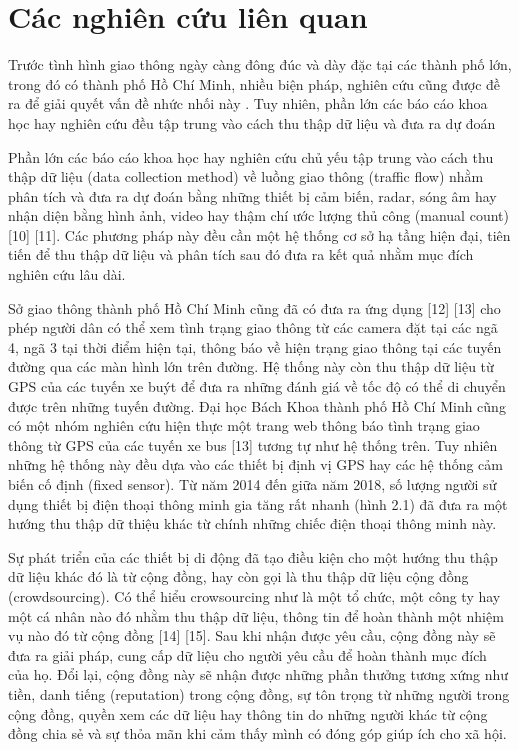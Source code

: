 
\chapter{Các nghiên cứu liên quan} %

\label{Chapter2} %

Trước tình hình giao thông ngày càng đông đúc và dày đặc tại các thành phố lớn, trong đó có thành phố Hồ Chí Minh, nhiều biện pháp, nghiên cứu cũng được đề ra để giải quyết vấn đề nhức nhối này \cite{FSPPM}. Tuy nhiên, phần lớn các báo cáo khoa học hay nghiên cứu đều tập trung vào cách thu thập dữ liệu và đưa ra dự đoán 

Phần lớn các báo cáo khoa học hay nghiên cứu chủ yếu tập trung vào cách thu thập dữ liệu (data collection method) về luồng giao thông (traffic flow) nhằm phân tích và đưa ra dự đoán bằng những thiết bị cảm biến, radar, sóng âm hay nhận diện bằng hình ảnh, video hay thậm chí ước lượng thủ công (manual count) [10] [11]. Các phương pháp này đều cần một hệ thống cơ sở hạ tầng hiện đại, tiên tiến để thu thập dữ liệu và phân tích sau đó đưa ra kết quả nhằm mục đích nghiên cứu lâu dài.

Sở giao thông thành phố Hồ Chí Minh cũng đã có đưa ra ứng dụng [12] [13] cho phép người dân có thể xem tình trạng giao thông từ các camera đặt tại các ngã 4, ngã 3 tại thời điểm hiện tại, thông báo về hiện trạng giao thông tại các tuyến đường qua các màn hình lớn trên đường. Hệ thống này còn thu thập dữ liệu từ GPS của các tuyến xe buýt để đưa ra những đánh giá về tốc độ có thể di chuyển được trên những tuyến đường. Đại học Bách Khoa thành phố Hồ Chí Minh cũng có một nhóm nghiên cứu hiện thực một trang web thông báo tình trạng giao thông từ GPS của các tuyến xe bus [13] tương tự như hệ thống trên. Tuy nhiên những hệ thống này đều dựa vào các thiết bị định vị GPS hay các hệ thống cảm biến cố định (fixed sensor). Từ năm 2014 đến giữa năm 2018, số lượng người sử dụng thiết bị điện thoại thông minh gia tăng rất nhanh (hình
2.1) đã đưa ra một hướng thu thập dữ thiệu khác từ chính những chiếc điện thoại thông minh này.

Sự phát triển của các thiết bị di động đã tạo điều kiện cho một hướng thu thập dữ liệu khác đó là từ cộng đồng, hay còn gọi là thu thập dữ liệu cộng đồng (crowdsourcing). Có thể hiểu crowsourcing như là một tổ chức, một công ty hay một cá nhân nào đó nhằm thu thập dữ liệu, thông tin để hoàn thành một nhiệm vụ nào đó từ cộng đồng [14] [15]. Sau khi nhận được yêu cầu, cộng đồng này sẽ đưa ra giải pháp, cung cấp dữ liệu cho người yêu cầu để hoàn thành mục đích của họ. Đổi lại, cộng đồng này sẽ nhận được những phần thưởng tương xứng như tiền, danh tiếng (reputation) trong cộng đồng, sự tôn trọng từ những người trong cộng đồng, quyền xem các dữ liệu hay thông tin do những người khác từ cộng đồng chia sẻ và sự thỏa mãn khi cảm thấy mình có đóng góp giúp ích cho xã hội.

